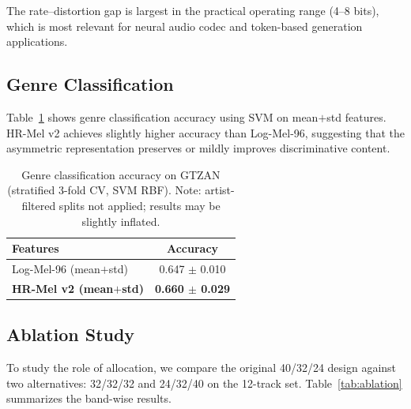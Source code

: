 \documentclass[twocolumn]{article}
\begin{document}
The rate--distortion gap is largest in the practical operating range (4--8 bits), which is most relevant for neural audio codec and token-based generation applications.

\subsection{Genre Classification}

Table~\ref{tab:classification} shows genre classification accuracy using SVM on mean$+$std features. HR-Mel v2 achieves slightly higher accuracy than Log-Mel-96, suggesting that the asymmetric representation preserves or mildly improves discriminative content.

\begin{table}[t]
\centering
\caption{Genre classification accuracy on GTZAN (stratified 3-fold CV, SVM RBF). Note: artist-filtered splits not applied; results may be slightly inflated.}
\label{tab:classification}
\small
\begin{tabular}{@{}lc@{}}
\toprule
Features & Accuracy \\
\midrule
Log-Mel-96 (mean$+$std) & 0.647 $\pm$ 0.010 \\
\textbf{HR-Mel v2 (mean$+$std)} & \textbf{0.660 $\pm$ 0.029} \\
\bottomrule
\end{tabular}
\end{table}

\subsection{Ablation Study}

To study the role of allocation, we compare the original 40/32/24 design against two alternatives: 32/32/32 and 24/32/40 on the 12-track set. Table~\ref{tab:ablation} summarizes the band-wise results.
\end{document}
